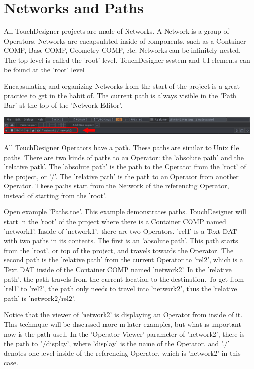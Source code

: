 \section{Networks and Paths}
\begin{fullwidth}
All TouchDesigner projects are made of Networks. A Network is a group of Operators. Networks are encapsulated inside of components, such as a Container COMP, Base COMP, Geometry COMP, etc. Networks can be infinitely nested. The top level is called the 'root' level. TouchDesigner system and UI elements can be found at the 'root' level.

Encapsulating and organizing Networks from the start of the project is a great practice to get in the habit of. The current path is always visible in the 'Path Bar' at the top of the 'Network Editor'.

\begin{center}
\includegraphics{./img/1.4/path-1.png}
\end{center}

All TouchDesigner Operators have a path. These paths are similar to Unix file paths. There are two kinds of paths to an Operator: the 'absolute path' and the 'relative path'. The 'absolute path' is the path to the Operator from the 'root' of the project, or '/'. The 'relative path' is the path to an Operator from another Operator. These paths start from the Network of the referencing Operator, instead of starting from the 'root'.

Open example 'Paths.toe'. This example demonstrates paths. TouchDesigner will start in the 'root' of the project where there is a Container COMP named 'network1'. Inside of 'network1', there are two Operators. 'rel1' is a Text DAT with two paths in its contents. The first is an 'absolute path'. This path starts from the 'root', or top of the project, and travels towards the Operator. The second path is the 'relative path' from the current Operator to 'rel2', which is a Text DAT inside of the Container COMP named 'network2'. In the 'relative path', the path travels from the current location to the destination. To get from 'rel1' to 'rel2', the path only needs to travel into 'network2', thus the 'relative path' is 'network2/rel2'.

Notice that the viewer of 'network2' is displaying an Operator from inside of it. This technique will be discussed more in later examples, but what is important now is the path used. In the 'Operator Viewer' parameter of 'network2', there is the path to './display', where 'display' is the name of the Operator, and './' denotes one level inside of the referencing Operator, which is 'network2' in this case. 


\end{fullwidth}
